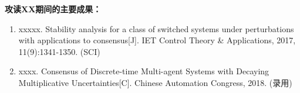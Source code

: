 

\personalresult


{\par\bfseries \noindent 攻读XX期间的主要成果：}
\begin{enumerate}
  \item  xxxxx. \newblock Stability analysis for a class of switched systems under
perturbations with applications to consensus[J].
\newblock IET Control Theory \& Applications, 2017, 11(9):1341-1350. (SCI)
  \item xxxx.
\newblock Consensus of Discrete-time Multi-agent Systems with Decaying Multiplicative Uncertainties[C].
\newblock Chinese Automation Congress, 2018. (录用)

\end{enumerate}

